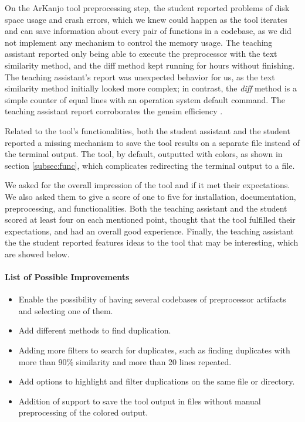 On the ArKanjo tool preprocessing step, the student reported problems of disk space usage and 
crash errors, which we knew could happen as the tool iterates and can save information about 
every pair of functions in a codebase, as we did not implement any mechanism to control the 
memory usage. The teaching assistant reported only being able to execute the preprocessor with 
the text similarity method, and the diff method kept running for hours without finishing. 
The teaching assistant's report was unexpected behavior for us, as the text similarity method 
initially looked more complex; in contrast, the \textit{diff} method is a simple counter of equal lines 
with an operation system default command. The teaching assistant report corroborates the 
gensim efficiency \citep{gensim}.

Related to the tool's functionalities, both the student assistant and the student reported 
a missing mechanism to save the tool results on a separate file instead of the terminal output. 
The tool, by default, outputted with colors, as shown in section \ref{subsec:func}, which complicates 
redirecting the terminal output to a file.

We asked for the overall impression of the tool and if it met their expectations. We also asked 
them to give a score of one to five for installation, documentation, preprocessing, and functionalities. 
Both the teaching assistant and the student scored at least four on each mentioned point, thought that 
the tool fulfilled their expectations, and had an overall good experience. Finally, the teaching assistant 
the the student reported features ideas to the tool that may be interesting, which 
are showed below.

\paragraph{List of Possible Improvements}

\begin{itemize}

\item Enable the possibility of having several codebases of preprocessor artifacts and selecting one of them.

\item Add different methods to find duplication.

\item Adding more filters to search for duplicates, such as finding duplicates with more than 90\% 
similarity and more than 20 lines repeated.

\item Add options to highlight and filter duplications on the same file or directory.

\item Addition of support to save the tool output in files without manual preprocessing of the colored output.

\end{itemize}

